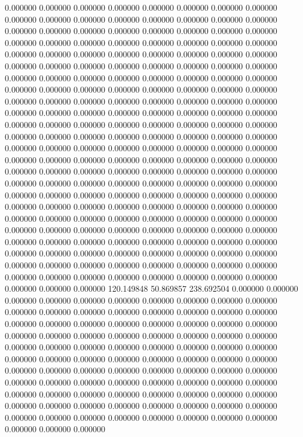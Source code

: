 0.000000 0.000000 0.000000
0.000000 0.000000 0.000000
0.000000 0.000000 0.000000
0.000000 0.000000 0.000000
0.000000 0.000000 0.000000
0.000000 0.000000 0.000000
0.000000 0.000000 0.000000
0.000000 0.000000 0.000000
0.000000 0.000000 0.000000
0.000000 0.000000 0.000000
0.000000 0.000000 0.000000
0.000000 0.000000 0.000000
0.000000 0.000000 0.000000
0.000000 0.000000 0.000000
0.000000 0.000000 0.000000
0.000000 0.000000 0.000000
0.000000 0.000000 0.000000
0.000000 0.000000 0.000000
0.000000 0.000000 0.000000
0.000000 0.000000 0.000000
0.000000 0.000000 0.000000
0.000000 0.000000 0.000000
0.000000 0.000000 0.000000
0.000000 0.000000 0.000000
0.000000 0.000000 0.000000
0.000000 0.000000 0.000000
0.000000 0.000000 0.000000
0.000000 0.000000 0.000000
0.000000 0.000000 0.000000
0.000000 0.000000 0.000000
0.000000 0.000000 0.000000
0.000000 0.000000 0.000000
0.000000 0.000000 0.000000
0.000000 0.000000 0.000000
0.000000 0.000000 0.000000
0.000000 0.000000 0.000000
0.000000 0.000000 0.000000
0.000000 0.000000 0.000000
0.000000 0.000000 0.000000
0.000000 0.000000 0.000000
0.000000 0.000000 0.000000
0.000000 0.000000 0.000000
0.000000 0.000000 0.000000
0.000000 0.000000 0.000000
0.000000 0.000000 0.000000
0.000000 0.000000 0.000000
0.000000 0.000000 0.000000
0.000000 0.000000 0.000000
0.000000 0.000000 0.000000
0.000000 0.000000 0.000000
0.000000 0.000000 0.000000
0.000000 0.000000 0.000000
0.000000 0.000000 0.000000
0.000000 0.000000 0.000000
0.000000 0.000000 0.000000
0.000000 0.000000 0.000000
0.000000 0.000000 0.000000
0.000000 0.000000 0.000000
0.000000 0.000000 0.000000
0.000000 0.000000 0.000000
0.000000 0.000000 0.000000
0.000000 0.000000 0.000000
0.000000 0.000000 0.000000
0.000000 0.000000 0.000000
0.000000 0.000000 0.000000
120.149848 50.869857 238.692504
0.000000 0.000000 0.000000
0.000000 0.000000 0.000000
0.000000 0.000000 0.000000
0.000000 0.000000 0.000000
0.000000 0.000000 0.000000
0.000000 0.000000 0.000000
0.000000 0.000000 0.000000
0.000000 0.000000 0.000000
0.000000 0.000000 0.000000
0.000000 0.000000 0.000000
0.000000 0.000000 0.000000
0.000000 0.000000 0.000000
0.000000 0.000000 0.000000
0.000000 0.000000 0.000000
0.000000 0.000000 0.000000
0.000000 0.000000 0.000000
0.000000 0.000000 0.000000
0.000000 0.000000 0.000000
0.000000 0.000000 0.000000
0.000000 0.000000 0.000000
0.000000 0.000000 0.000000
0.000000 0.000000 0.000000
0.000000 0.000000 0.000000
0.000000 0.000000 0.000000
0.000000 0.000000 0.000000
0.000000 0.000000 0.000000
0.000000 0.000000 0.000000
0.000000 0.000000 0.000000
0.000000 0.000000 0.000000
0.000000 0.000000 0.000000
0.000000 0.000000 0.000000
